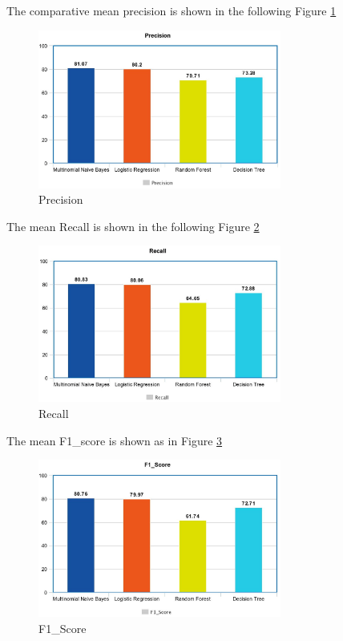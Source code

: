 \documentclass[a4paper]{article}
\begin{document}
The comparative mean precision is shown in the following Figure \ref{fig:Repeated KFold Precision}
\begin{figure}[H]
 \centering
   \includegraphics[width= 8cm]{RepeatedKFoldPrecision}
\caption{Precision}
  \label{fig:Repeated KFold Precision}
\end{figure}

The mean Recall is shown in the following Figure \ref{fig:Repeated KFold Recall}
\begin{figure}[H]
 \centering
   \includegraphics[width= 8cm]{RepeatedKFoldRecall}
\caption{Recall}
  \label{fig:Repeated KFold Recall}
\end{figure}

The mean F1\_score is shown as in Figure \ref{fig:Repeated KFold F1_score}
\begin{figure}[H]
 \centering
   \includegraphics[width= 8cm]{RepeatedKFoldF1_score}
\caption{F1\_Score}
  \label{fig:Repeated KFold F1_score}
\end{figure}
\end{document}
